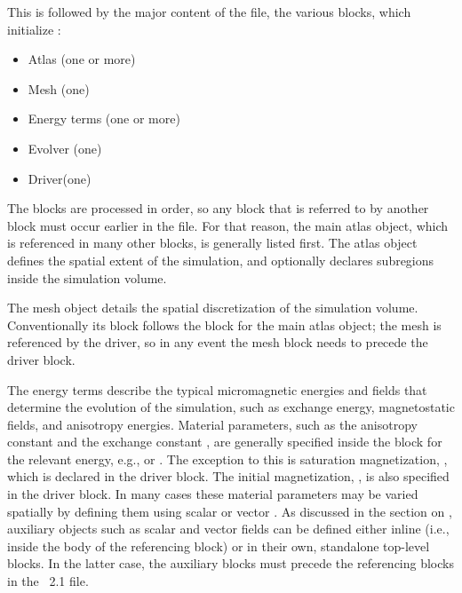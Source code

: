 This is followed by the major content of the file, the various
 blocks, which initialize
:
\begin{itemize}
  \item Atlas (one or more)
  \item Mesh (one)
  \item Energy terms (one or more)
  \item Evolver (one)
  \item Driver(one)
\end{itemize}
The  blocks are processed in order, so any block that is
referred to by another block must occur earlier in the file.  For that
reason, the main atlas object, which is referenced in many other
 blocks, is generally listed first.  The atlas object
defines the spatial extent of the simulation, and optionally declares
subregions inside the simulation volume.

The mesh object details the spatial discretization of the simulation
volume.  Conventionally its  block follows the 
block for the main atlas object; the mesh is referenced by the driver,
so in any event the mesh  block needs to precede the driver
 block.

The energy terms describe the typical micromagnetic energies and fields
that determine the evolution of the simulation, such as exchange energy,
magnetostatic fields, and anisotropy energies.  Material parameters,
such as the anisotropy constant  and the exchange constant
, are generally specified inside the  block for the
relevant energy, e.g.,  or
.  The exception to this is saturation
magnetization, , which is declared in the driver  block.
The initial magnetization, , is also specified in the driver
 block.  In many cases these material parameters may be
varied spatially by defining them using scalar or vector
.  As discussed
in the section on , auxiliary objects such as scalar and
vector fields can be defined either inline (i.e., inside the body of the
referencing  block) or in their own, standalone top-level
 blocks.  In the latter case, the auxiliary
 blocks must precede the referencing  blocks in
the \MIF~2.1 file.

